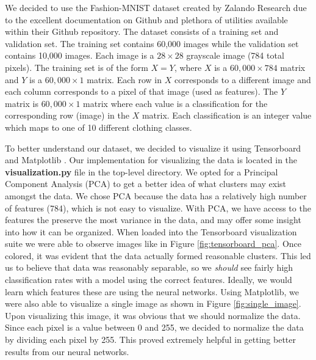 \documentclass[conference]{IEEEtran}
\begin{document}
\par We decided to use the Fashion-MNIST dataset created by Zalando Research due to the excellent documentation on Github and plethora of utilities available within their Github repository. The dataset consists of a training set and validation set. The training set contains 60,000 images while the validation set contains 10,000 images. Each image is a $28 \times 28$ grayscale image (784 total pixels). The training set is of the form $X = Y$, where $X$ is a $60,000 \times 784$ matrix and $Y$ is a $60,000 \times 1$ matrix. Each row in $X$ corresponds to a different image and each column corresponds to a pixel of that image (used as features). The $Y$ matrix is $60,000 \times 1$ matrix where each value is a classification for the corresponding row (image) in the $X$ matrix. Each classification is an integer value which maps to one of 10 different clothing classes.
\par To better understand our dataset, we decided to visualize it using Tensorboard \cite{tensorboard} and Matplotlib \cite{matplotlib}. Our implementation for visualizing the data is located in the \textbf{visualization.py} file in the top-level directory. We opted for a Principal Component Analysis (PCA) to get a better idea of what clusters may exist amongst the data. We chose PCA because the data has a relatively high number of features (784), which is not easy to visualize. With PCA, we have access to the features the preserve the most variance in the data, and may offer some insight into how it can be organized. When loaded into the Tensorboard visualization suite we were able to observe images like in Figure \ref{fig:tensorboard_pca}. Once colored, it was evident that the data actually formed reasonable clusters. This led us to believe that data was reasonably separable, so we \textit{should} see fairly high classification rates with a model using the correct features. Ideally, we would learn which features these are using the neural networks. Using Matplotlib, we were also able to visualize a single image as shown in Figure \ref{fig:single_image}. Upon visualizing this image, it was obvious that we should normalize the data. Since each pixel is a value between 0 and 255, we decided to normalize the data by dividing each pixel by 255. This proved extremely helpful in getting better results from our neural networks.
\end{document}
